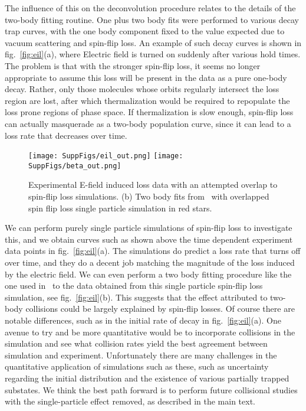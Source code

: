 \documentclass[%
 reprint,
 amsmath,amssymb,
 aps,
prl,
]{revtex4-1}
\begin{document}
The influence of this on the deconvolution procedure relates to the details of the two-body fitting routine.
One plus two body fits were performed to various decay trap curves, with the one body component fixed to the value expected due to vacuum scattering and spin-flip loss.
An example of  such decay curves is shown in fig.~\ref{fig:eil}(a), where Electric field is turned on suddenly after various hold times.
The problem is that with the stronger spin-flip loss, it seems no longer appropriate to assume this loss will be present in the data as a pure one-body decay.
Rather, only those molecules whose orbits regularly intersect the loss region are lost, after which thermalization would be required to repopulate the loss prone regions of phase space. 
If thermalization is slow enough, spin-flip loss can actually masquerade as a two-body population curve, since it can lead to a loss rate that decreases over time.


\begin{figure}
\texttt{[image: SuppFigs/eil\_out.png]} 
\label{fig:eil}
\newline
\texttt{[image: SuppFigs/beta\_out.png]} 
\label{fig:beta}

\caption{Experimental E-field induced loss data with an attempted overlap to spin-flip loss simulations. (b) Two body fits from~\cite{Stuhl2013} with overlapped spin flip loss single particle simulation in red stars.}

\end{figure}


We can perform purely single particle simulations of spin-flip loss to investigate this, and we obtain curves such as shown above the time dependent experiment data points in fig.~\ref{fig:eil}(a).
The simulations do predict a loss rate that turns off over time, and they do a decent job matching the magnitude of the loss induced by the electric field.
We can even perform a two body fitting procedure like the one used in~\cite{Stuhl2013} to the data obtained from this single particle spin-flip loss simulation, see fig.~\ref{fig:eil}(b). 
This suggests that the effect attributed to two-body collisions could be largely explained by spin-flip losses.
Of course there are notable differences, such as in the initial rate of decay in fig.~\ref{fig:eil}(a).
One avenue to try and be more quantitative would be to incorporate collisions in the simulation and see what collision rates yield the best agreement between simulation and experiment.
Unfortunately there are many challenges in the quantitative application of simulations such as these, such as uncertainty regarding the initial distribution and the existence of various partially trapped substates.
We think the best path forward is to perform future collisional studies with the single-particle effect removed, as described in the main text.
\end{document}
